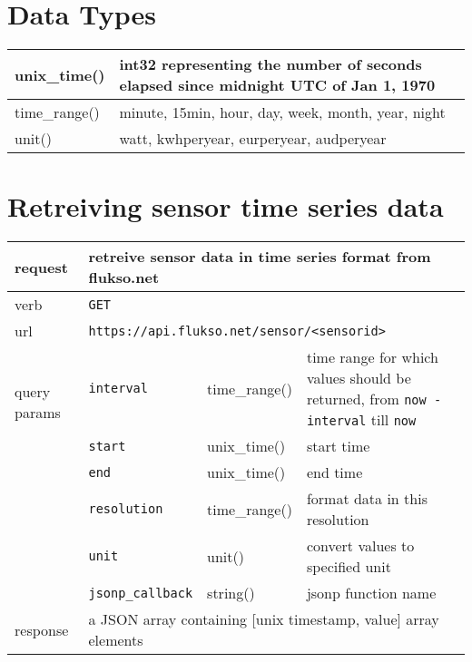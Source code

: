 \section{Data Types}
\begin{tabular}{|l|p{9.5cm}|}

\hline
unix\_time() & int32 representing the number of seconds elapsed since midnight UTC of Jan 1, 1970 \\

\hline
time\_range() & minute, 15min, hour, day, week, month, year, night \\

\hline
unit() & watt, kwhperyear, eurperyear, audperyear \\

\hline

\end{tabular}

\section{Retreiving sensor time series data}
\begin{tabular}{|l|l|l|p{5cm}|}

\hline
request & \multicolumn{3}{|l|}{retreive sensor data in time series format from flukso.net} \\

\hline
verb & \multicolumn{3}{|l|}{\texttt{GET}} \\

\hline
url & \multicolumn{3}{|l|}{\texttt{https://api.flukso.net/sensor/\textless sensorid\textgreater}} \\

\hline
\multirow{2}{*}{query params} & \texttt{interval} & time\_range() & time range for which values should be returned, from \texttt{now - interval} till \texttt{now} \\
& \texttt{start} & unix\_time() & start time \\
& \texttt{end} & unix\_time() & end time \\
& \texttt{resolution} & time\_range() & format data in this resolution \\
& \texttt{unit} & unit() & convert values to specified unit \\
& \texttt{{\small jsonp\_callback}} & string() & jsonp function name \\

\hline
response & \multicolumn{3}{|l|}{a JSON array containing [unix timestamp, value] array elements} \\

\hline

\end{tabular}

